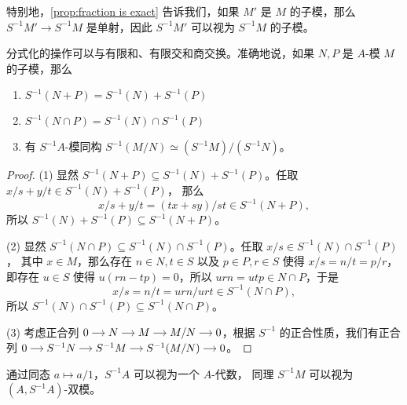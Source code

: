 特别地，\autoref{prop:fraction is exact} 告诉我们，如果 $M'$ 是 $M$
的子模，那么 $S^{-1}M'\to S^{-1}M$ 是单射，因此 $S^{-1}M'$ 可以视为 $S^{-1}M$
的子模。

\begin{corollary}\label{coro:rule of fraction}
  分式化的操作可以与有限和、有限交和商交换。准确地说，如果 $N,P$ 是 $A$-模 $M$
  的子模，那么
  \begin{enumerate}
    \item $S^{-1}(N+P)=S^{-1}(N)+S^{-1}(P)$
    \item $S^{-1}(N\cap P)=S^{-1}(N)\cap S^{-1}(P)$
    \item 有 $S^{-1}A$-模同构 $S^{-1}(M/N)\simeq (S^{-1}M)/(S^{-1}N)$。
  \end{enumerate}
\end{corollary}
\begin{proof}
  (1) 显然 $S^{-1}(N+P)\subseteq S^{-1}(N)+S^{-1}(P)$。任取 $x/s+y/t\in S^{-1}(N)+S^{-1}(P)$，
  那么
  \[
    x/s+y/t=(tx+sy)/st\in S^{-1}(N+P),  
  \]
  所以 $S^{-1}(N)+S^{-1}(P)\subseteq S^{-1}(N+P)$。

  (2) 显然 $S^{-1}(N\cap P)\subseteq S^{-1}(N)\cap S^{-1}(P)$。任取 $x/s\in S^{-1}(N)\cap S^{-1}(P)$，
  其中 $x\in M$，那么存在 $n\in N,t\in S$ 以及 $p\in P,r\in S$ 使得 $x/s=n/t=p/r$，即存在
  $u\in S$ 使得 $u(rn-tp)=0$，所以 $urn=utp\in N\cap P$，于是
  \[
    x/s=n/t=urn/urt\in S^{-1}(N\cap P),  
  \]
  所以 $ S^{-1}(N)\cap S^{-1}(P)\subseteq S^{-1}(N\cap P)$。

  (3) 考虑正合列
  $
  \begin{tikzcd}[cramped,column sep=small]
    0\arrow[r] & N\arrow[r] & M\arrow[r] & M/N\arrow[r] & 0
  \end{tikzcd}
  $，根据 $S^{-1}$ 的正合性质，我们有正合列 
  $
  \begin{tikzcd}[cramped,column sep=small]
    0\arrow[r] & S^{-1}N\arrow[r] & S^{-1}M\arrow[r] & S^{-1}(M/N)\arrow[r] & 0
  \end{tikzcd}
  $。 
\end{proof}

通过同态 $a\mapsto a/1$，$S^{-1}A$ 可以视为一个 $A$-代数，
同理 $S^{-1}M$ 可以视为 $(A,S^{-1}A)$-双模。

